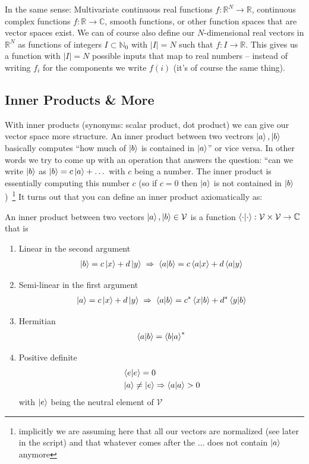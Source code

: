 In the same sense: Multivariate continuous real functions $f: \mathbb{R}^N \rightarrow \mathbb{R}$, continuous complex functions $f: \mathbb{R} \rightarrow \mathbb{C}$, smooth functions, or other function spaces that are vector spaces exist. 
We can of course also define our $N$-dimensional real vectors in $\mathbb{R}^N$ as functions of integers $I \subset \mathbb{N}_0$ with $|I|=N$ such that $f: I \rightarrow \mathbb{R}$. This gives us a function with $|I|=N$ possible inputs that map to real numbers -- instead of writing $f_i$ for the components we write $f(i)$ (it's of course the same thing).

\subsection{Inner Products \& More}
With inner products (synonyms: scalar product, dot product) we can give our vector space more structure. An inner product between two vectrors $\ket{a},\ket{b}$ basically computes ``how much of $\ket{b}$ is contained in $\ket{a}$'' or vice versa. In other words we try to come up with an operation that answers the question: ``can we write $\ket{b}$ as $\ket{b} = c\ket{a} + \dots$ with $c$ being a number. The inner product is essentially computing this number $c$ (so if $c=0$ then $\ket{a}$ is not contained in $\ket{b}$)~\footnote{implicitly we are assuming here that all our vectors are normalized (see later in the script) and that whatever comes after the $\dots$ does not contain $\ket{a}$ anymore}
It turns out that you can define an inner product axiomatically as:
\begin{def*}
    An inner product between two vectors $\ket{a},\ket{b}\in\mathcal{V}$ is a function $\braket{\cdot}{\cdot}: \mathcal{V}\times\mathcal{V} \rightarrow \mathbb{C}$ that is
    \begin{enumerate}
        \item Linear in the second argument
        \begin{align*}
            \ket{b}=c\ket{x}+d\ket{y}\;\Rightarrow\; \braket{a}{b} = c\braket{a}{x} + d\braket{a}{y} 
        \end{align*}
        \item Semi-linear in the first argument
        \begin{align*}
            \ket{a}=c\ket{x}+d\ket{y}\;\Rightarrow\; \braket{a}{b} = c^*\braket{x}{b} + d^*\braket{y}{b} 
        \end{align*}
        \item Hermitian
        \begin{align*}
            \braket{a}{b} = \braket{b}{a}^*
        \end{align*}
        \item Positive definite
        \begin{align*}
            &\braket{e}{e} = 0\\
            &\ket{a}\neq \ket{e} \Rightarrow \braket{a}{a} > 0 
        \end{align*}
        with $\ket{e}$ being the neutral element of $\mathcal{V}$
    \end{enumerate}
\end{def*}
